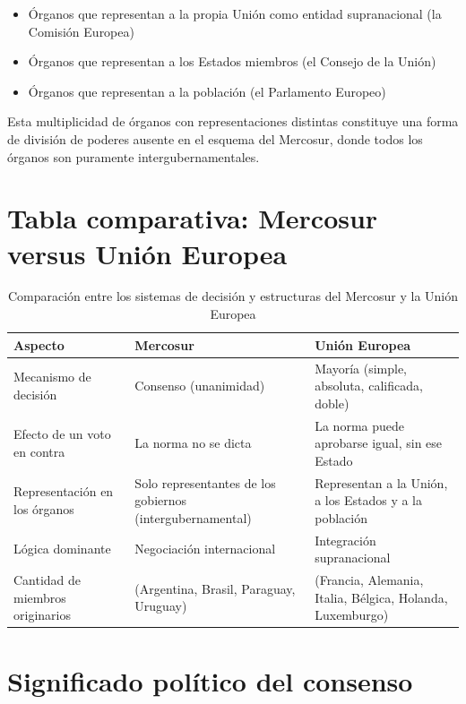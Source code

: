 \documentclass[12pt,oneside]{book}
\begin{document}
\begin{itemize}
\item Órganos que representan a la propia Unión como entidad supranacional (la Comisión Europea)
\item Órganos que representan a los Estados miembros (el Consejo de la Unión)
\item Órganos que representan a la población (el Parlamento Europeo)
\end{itemize}

Esta multiplicidad de órganos con representaciones distintas constituye una forma de división de poderes ausente en el esquema del Mercosur, donde todos los órganos son puramente intergubernamentales.

\section{Tabla comparativa: Mercosur versus Unión Europea}

\begin{table}[H]
\centering
\begin{tabularx}{\textwidth}{
    >{\raggedright\arraybackslash}p{}
    >{\raggedright\arraybackslash}X
    >{\raggedright\arraybackslash}X
}
\toprule
\textbf{Aspecto} & \textbf{Mercosur} & \textbf{Unión Europea} \\
\midrule
Mecanismo de decisión & Consenso (unanimidad) & Mayoría (simple, absoluta, calificada, doble) \\
Efecto de un voto en contra & La norma no se dicta & La norma puede aprobarse igual, sin ese Estado \\
Representación en los órganos & Solo representantes de los gobiernos (intergubernamental) & Representan a la Unión, a los Estados y a la población \\
Lógica dominante & Negociación internacional & Integración supranacional \\
Cantidad de miembros originarios & 4 (Argentina, Brasil, Paraguay, Uruguay) & 6 (Francia, Alemania, Italia, Bélgica, Holanda, Luxemburgo) \\
\bottomrule
\end{tabularx}
\caption{Comparación entre los sistemas de decisión y estructuras del Mercosur y la Unión Europea}
\end{table}

\section{Significado político del consenso}
\end{document}
